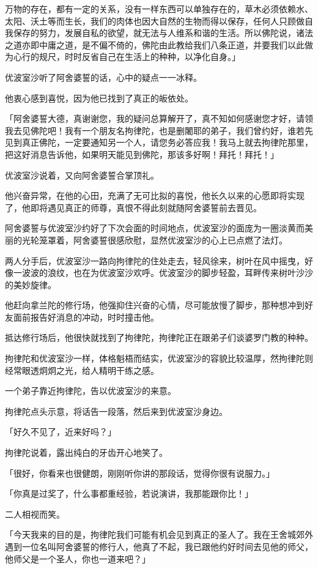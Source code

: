 \documentclass[twoside,openany]{book}
\begin{document}
万物的存在，都有一定的关系，没有一样东西可以单独存在的，草木必须依赖水、太阳、沃土等而生长，我们的肉体也因大自然的生物而得以保存，任何人只顾做自我保存的努力，发展自私的欲望，就无法与人维系和谐的生活。所以佛陀说，诸法之道亦即中庸之道，是不偏不倚的，佛陀由此教给我们八条正道，并要我们以此做为心行的规尺，时时反省自己在生活上的种种，以净化自身。」

优波室沙听了阿舍婆誓的话，心中的疑点一一冰释。

他衷心感到喜悦，因为他已找到了真正的皈依处。

「阿舍婆誓大德，真谢谢您，我的疑问总算解开了，真不知如何感谢您才好，请领我去见佛陀吧！我有一个朋友名拘律陀，也是删闍耶的弟子，我们曾约好，谁若先见到真正佛陀，一定要通知另一个人，请您务必答应我！我马上就去拘律陀那里，把这好消息告诉他，如果明天能见到佛陀，那该多好啊！拜托！拜托！」

优波室沙说着，又向阿舍婆誓合掌顶礼。

他兴奋异常，在他的心田，充满了无可比拟的喜悦，他长久以来的心愿即将实现了，他即将遇见真正的师尊，真恨不得此刻就随阿舍婆誓前去晋见。

阿舍婆誓与优波室沙约好了下次会面的时间地点，优波室沙的面庞为一圈淡黄而美丽的光轮笼罩着，阿舍婆誓很感欣慰，显然优波室沙的心上已点燃了法灯。

两人分手后，优波室沙一路向拘律陀的住处走去，轻风徐来，树叶在风中摇曳，好像一波波的浪纹，也在为优波室沙欢呼。优波室沙的脚步轻盈，耳畔传来树叶沙沙的美妙旋律。

他赶向拿兰陀的修行场，他强抑住兴奋的心情，尽可能放慢了脚步，那种想冲到好友面前报告好消息的冲动，时时撞击他。

抵达修行场后，他很快就找到了拘律陀，拘律陀正在跟弟子们谈婆罗门教的种种。

拘律陀和优波室沙一样，体格魁梧而结实，优波室沙的容貌比较温厚，然拘律陀则经常眼透炯炯之光，给人精明干练之感。

一个弟子靠近拘律陀，告以优波室沙的来意。

拘律陀点头示意，将话告一段落，然后来到优波室沙身边。

「好久不见了，近来好吗？」

拘律陀说着，露出纯白的牙齿开心地笑了。

「很好，你看来也很健朗，刚刚听你讲的那段话，觉得你很有说服力。」

「你真是过奖了，什么事都重经验，若说演讲，我那能跟你比！」

二人相视而笑。

「今天我来的目的是，拘律陀我们可能有机会见到真正的圣人了。我在王舍城郊外遇到一位名叫阿舍婆誓的修行人，他真了不起，我已跟他约好时间去见他的师父，他师父是一个圣人，你也一道来吧？」
\end{document}
